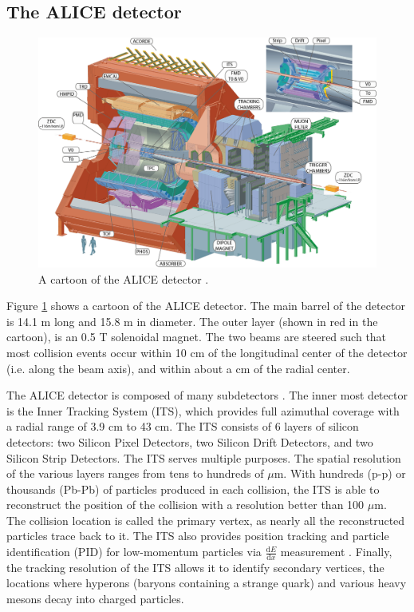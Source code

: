 \subsection{The ALICE detector}
\label{sec:ALICEDetector}

 
\begin{figure}[hbt]
\includegraphics[width=36pc]{Figures/BorrowedFigures/ALICEDetector.jpg}
\caption[Cartoon of the ALICE detector]{A cartoon of the ALICE detector \cite{Aamodt:2008zz}.}
\label{fig:ALICEDetector}
\end{figure}
Figure \ref{fig:ALICEDetector} shows a cartoon of the ALICE detector.
The main barrel of the detector is 14.1 m long and 15.8 m in diameter. The outer layer (shown in red in the cartoon), is an 0.5 T solenoidal magnet.
The two beams are steered such that most collision events occur within 10 cm of the longitudinal center of the detector (i.e. along the beam axis), and within about a cm of the radial center.

The ALICE detector is composed of many subdetectors \cite{Aamodt:2008zz}.
The inner most detector is the Inner Tracking System (ITS), which provides full azimuthal coverage with a radial range of 3.9 cm to 43 cm.
The ITS consists of 6 layers of silicon detectors: two Silicon Pixel Detectors, two Silicon Drift Detectors, and two Silicon Strip Detectors.
The ITS serves multiple purposes.
The spatial resolution of the various layers ranges from tens to hundreds of $\mu$m.
With hundreds (p-p) or thousands (Pb-Pb) of particles produced in each collision, the ITS is able to reconstruct the position of the collision with a resolution better than 100 $\mu$m.
The collision location is called the primary vertex, as nearly all the reconstructed particles trace back to it.
The ITS also provides position tracking and particle identification (PID) for low-momentum particles via $\frac{\mathrm{d}E}{\mathrm{d}x}$ measurement \cite{Jackson:1998nia}.
Finally, the tracking resolution of the ITS allows it to identify secondary vertices, the locations where hyperons (baryons containing a strange quark) and various heavy mesons decay into charged particles.

